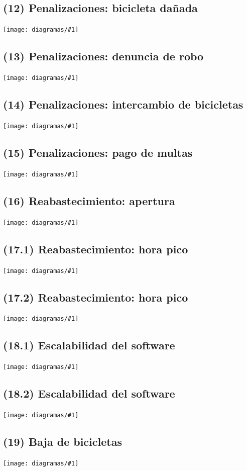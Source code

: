 \documentclass[a4paper, 10pt, twoside]{article}
\newcommand{\diagramah}[1]{
  \texttt{[image: diagramas/\#1]}
}
\begin{document}
\subsection{(12)   Penalizaciones: bicicleta dañada}
\diagramah{objetivos-12}

\subsection{(13)   Penalizaciones: denuncia de robo}
\diagramah{objetivos-13}

\subsection{(14)   Penalizaciones: intercambio de bicicletas}
\diagramah{objetivos-14}

\subsection{(15)   Penalizaciones: pago de multas}
\diagramah{objetivos-15}

\subsection{(16)   Reabastecimiento: apertura}
\diagramah{objetivos-16}

\subsection{(17.1) Reabastecimiento: hora pico}
\diagramah{objetivos-17.1}

\subsection{(17.2) Reabastecimiento: hora pico}
\diagramah{objetivos-17.2}

\subsection{(18.1) Escalabilidad del software}
\diagramah{objetivos-18.1}

\subsection{(18.2) Escalabilidad del software}
\diagramah{objetivos-18.2}

\subsection{(19)   Baja de bicicletas}
\diagramah{objetivos-19}
\end{document}
